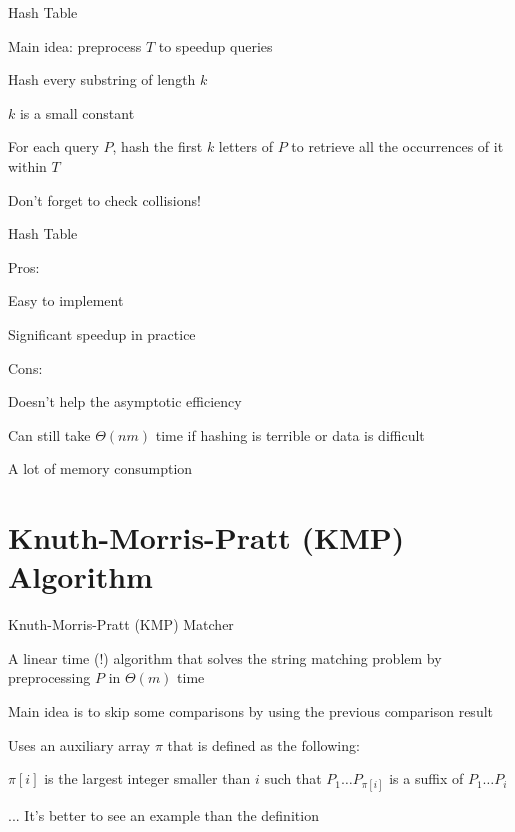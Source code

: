 \documentclass[13pt,onlymath]{beamer}
\begin{document}
\begin{frame}{Hash Table}
\BIT
\item Main idea: preprocess $T$ to speedup queries
\BIT
\item Hash every substring of length $k$
\item $k$ is a small constant
\EIT
\vfill
\item For each query $P$, hash the first $k$ letters of $P$ to retrieve all the occurrences of it within $T$
\vfill
\item Don't forget to check collisions!
\EIT
\end{frame}

\begin{frame}{Hash Table}
\BIT
\item Pros:
\BIT
\item Easy to implement
\item Significant speedup in practice
\EIT
\vfill
\item Cons:
\BIT
\item Doesn't help the asymptotic efficiency
\BIT
\item Can still take $\Theta(nm)$ time if hashing is terrible or data is difficult
\EIT
\item A lot of memory consumption
\EIT\EIT
\end{frame}


\section{Knuth-Morris-Pratt (KMP) Algorithm}

\begin{frame}{Knuth-Morris-Pratt (KMP) Matcher}
\BIT
\item A linear time (!) algorithm that solves the string matching problem by preprocessing $P$ in $\Theta(m)$ time
\BIT
\item Main idea is to skip some comparisons by using the previous comparison result
\EIT
\item Uses an auxiliary array $\pi$ that is defined as the following:
\BIT
\item $\pi[i]$ is the largest integer smaller than $i$ such that $P_1 \ldots P_{\pi[i]}$ is a suffix of $P_1 \ldots P_i$
\EIT
\item ... It's better to see an example than the definition
\EIT
\end{frame}
\end{document}

